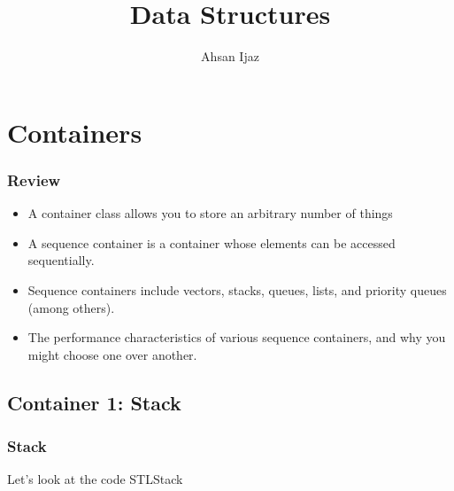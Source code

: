 \documentclass{beamer}
\newtheorem{Key points}{Key points}
\begin{document}
\title[Lecture 5]{Data Structures} 
\author[]{Ahsan Ijaz}
\date{}
 \frame{\titlepage}

\section{Containers}
\begin{frame}
  \frametitle{Review}
  \begin{itemize}
  \item<1-> A container class allows you to store an
arbitrary number of things
\item<2-> A sequence container is a container whose
elements can be accessed sequentially.
\item<3-> Sequence containers include vectors,
stacks, queues, lists, and priority queues
(among others).
\item<4-> The performance characteristics of various
sequence containers, and why you might
choose one over another.
  \end{itemize}
\end{frame}
\subsection{Container 1: Stack}
\begin{frame}
  \frametitle{Stack}
  \begin{center}
   \Huge{Let's look at the code STLStack}
  \end{center}
\end{frame}
\end{document}
